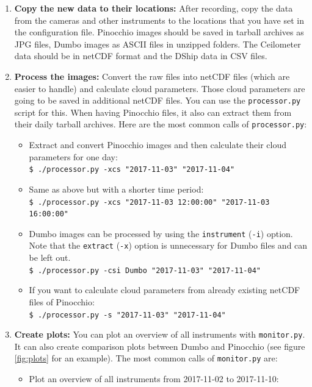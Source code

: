 \documentclass[11pt,a4paper]{article}
\begin{document}
\begin{enumerate}
	\item \textbf{Copy the new data to their locations:} After recording, copy the data from the cameras and other instruments to the locations that you have set in the configuration file. Pinocchio images should be saved in tarball archives as JPG files, Dumbo images as ASCII files in unzipped folders. The Ceilometer data should be in netCDF format and the DShip data in CSV files.
	\item \textbf{Process the images:} Convert the raw files into netCDF files (which are easier to handle) and calculate cloud parameters. Those cloud parameters are going to be saved in additional netCDF files. You can use the \texttt{processor.py} script for this. When having Pinocchio files, it also can extract them from their daily tarball archives. Here are the most common calls of \texttt{processor.py}:
	\begin{itemize}
		\item Extract and convert Pinocchio images and then calculate their cloud parameters for one day:\\
		\texttt{\$ ./processor.py -xcs "2017-11-03" "2017-11-04" }
		\item Same as above but with a shorter time period:\\
		\texttt{\$ ./processor.py -xcs "2017-11-03 12:00:00" "2017-11-03 16:00:00" }
		\item Dumbo images can be processed by using the \texttt{instrument} (\texttt{-i}) option. Note that the \texttt{extract} (\texttt{-x}) option is unnecessary for Dumbo files and can be left out.\\
		\texttt{\$ ./processor.py -csi Dumbo "2017-11-03" "2017-11-04" }
		\item If you want to calculate cloud parameters from already existing netCDF files of Pinocchio: \\
		\texttt{\$ ./processor.py -s "2017-11-03" "2017-11-04" }
	\end{itemize}
	\item \textbf{Create plots:}  You can plot an overview of all instruments with \texttt{monitor.py}. It can also create comparison plots between Dumbo and Pinocchio (see figure \ref{fig:plots} for an example). The most common calls of \texttt{monitor.py} are:
	\begin{itemize}
		\item Plot an overview of all instruments from 2017-11-02 to 2017-11-10:\\

\end{itemize}
\end{enumerate}
\end{document}

